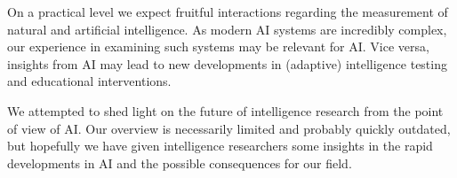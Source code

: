 On a practical level we expect fruitful interactions regarding
the measurement of natural and artificial intelligence.
As modern AI systems are incredibly complex, our experience
in examining such systems may be relevant for AI.
Vice versa, insights from AI may lead to new developments in
(adaptive) intelligence testing and educational interventions.

We attempted to shed light on the future of intelligence research
from the point of view of AI.
Our overview is necessarily limited and probably quickly outdated,
but hopefully we have given intelligence researchers some insights
in the rapid developments in AI and the possible consequences
for our field.
